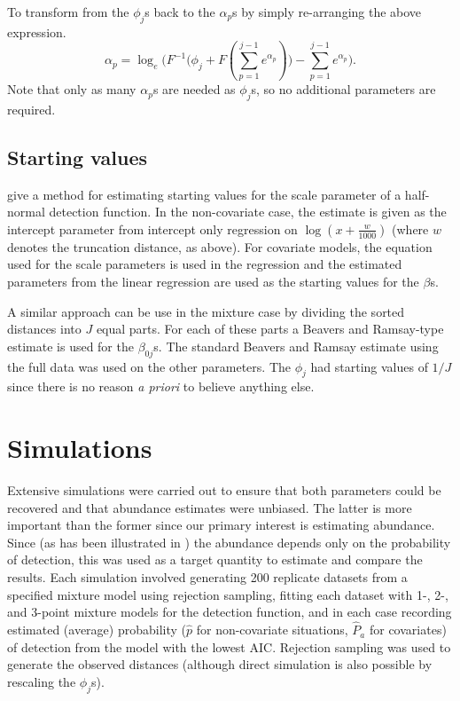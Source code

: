 To transform from the $\phi_j$s back to the $\alpha_p$s by simply re-arranging the above expression.
\begin{equation*}
\alpha_p = \log_e \Big(F^{-1}\Big(\phi_j + F(\sum_{p=1}^{j-1} e^{\alpha_p})\Big) - \sum_{p=1}^{j-1} e^{\alpha_p}\Big).
\end{equation*}
Note that only as many $\alpha_p$s are needed as $\phi_j$s, so no additional parameters are required.

\subsection{Starting values}

 give a method for estimating starting values for the scale parameter of a half-normal detection function. In the non-covariate case, the estimate is given as the intercept parameter from intercept only regression on $\log(x+\frac{w}{1000})$ (where $w$ denotes the truncation distance, as above). For covariate models, the equation used for the scale parameters is used in the regression and the estimated parameters from the linear regression are used as the starting values for the $\beta$s.

A similar approach can be use in the mixture case by dividing the sorted distances into $J$ equal parts. For each of these parts a Beavers and Ramsay-type estimate is used for the $\beta_{0j}$s. The standard Beavers and Ramsay estimate using the full data was used on the other parameters. The $\phi_j$ had starting values of $1/J$ since there is no reason \textit{a priori} to believe anything else.

\section{Simulations}
\label{mmds-sims}

Extensive simulations were carried out to ensure that both parameters could be recovered and that abundance estimates were unbiased. The latter is more important than the former since our primary interest is estimating abundance. Since (as has been illustrated in ) the abundance depends only on the probability of detection, this was used as a target quantity to estimate and compare the results. Each simulation involved generating 200 replicate datasets from a specified mixture model using rejection sampling, fitting each dataset with 1-, 2-, and 3-point mixture models for the detection function, and in each case recording estimated (average) probability ($\hat{p}$ for non-covariate situations, $\hat{P}_a$ for covariates) of detection from the model with the lowest AIC. Rejection sampling was used to generate the observed distances (although direct simulation is also possible by rescaling the $\phi_j$s).

